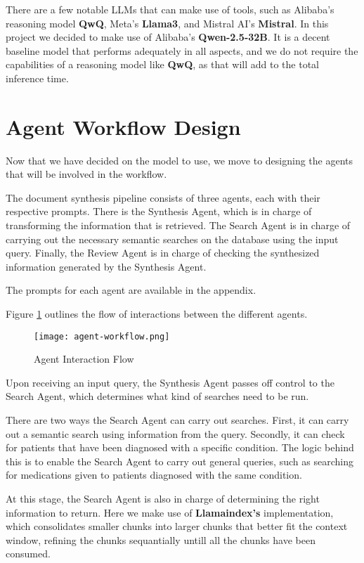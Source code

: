 There are a few notable LLMs that can make use of tools, such as Alibaba's reasoning model \textbf{QwQ}, Meta's \textbf{Llama3}, and Mistral AI's \textbf{Mistral}. In this project we decided to make use of Alibaba's \textbf{Qwen-2.5-32B}. It is a decent baseline model that performs adequately in all aspects, and we do not require the capabilities of a reasoning model like \textbf{QwQ}, as that will add to the total inference time.

\section{Agent Workflow Design}

Now that we have decided on the model to use, we move to designing the agents that will be involved in the workflow.

The document synthesis pipeline consists of three agents, each with their respective prompts.
There is the Synthesis Agent, which is in charge of transforming the information that is retrieved. The Search Agent is in charge of carrying out the necessary semantic searches on the database using the input query. Finally, the Review Agent is in charge of checking the synthesized information generated by the Synthesis Agent.

The prompts for each agent are available in the appendix.

Figure \ref{fig:AgentInteraction} outlines the flow of interactions between the different agents.

\begin{figure}
	\centering
	\texttt{[image: agent-workflow.png]}
	\caption{Agent Interaction Flow}
	\label{fig:AgentInteraction}
\end{figure}

Upon receiving an input query, the Synthesis Agent passes off control to the Search Agent, which determines what kind of searches need to be run.

There are two ways the Search Agent can carry out searches. First, it can carry out a semantic search using information from the query. Secondly, it can check for patients that have been diagnosed with a specific condition. The logic behind this is to enable the Search Agent to carry out general queries, such as searching for medications given to patients diagnosed with the same condition.

At this stage, the Search Agent is also in charge of determining the right information to return. Here we make use of \textbf{Llamaindex's} implementation,  which consolidates smaller chunks into larger chunks that better fit the context window, refining the chunks sequantially untill all the chunks have been consumed.

